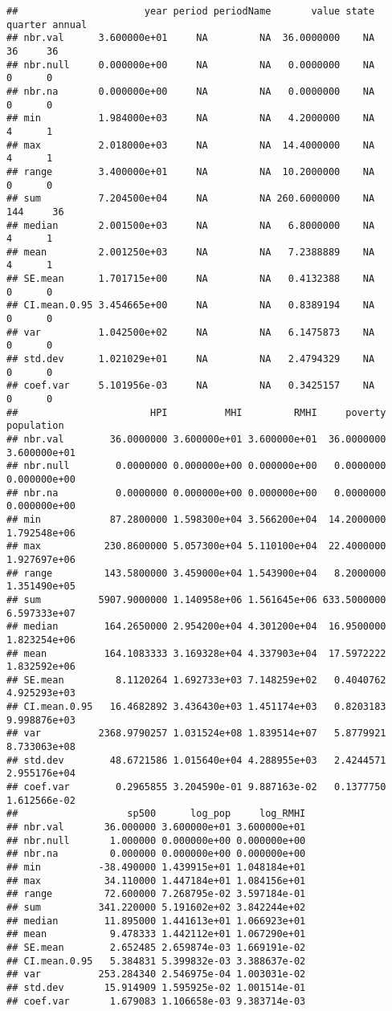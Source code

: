 \documentclass[
]{article}
\begin{document}
\begin{verbatim}
##                      year period periodName       value state quarter annual
## nbr.val      3.600000e+01     NA         NA  36.0000000    NA      36     36
## nbr.null     0.000000e+00     NA         NA   0.0000000    NA       0      0
## nbr.na       0.000000e+00     NA         NA   0.0000000    NA       0      0
## min          1.984000e+03     NA         NA   4.2000000    NA       4      1
## max          2.018000e+03     NA         NA  14.4000000    NA       4      1
## range        3.400000e+01     NA         NA  10.2000000    NA       0      0
## sum          7.204500e+04     NA         NA 260.6000000    NA     144     36
## median       2.001500e+03     NA         NA   6.8000000    NA       4      1
## mean         2.001250e+03     NA         NA   7.2388889    NA       4      1
## SE.mean      1.701715e+00     NA         NA   0.4132388    NA       0      0
## CI.mean.0.95 3.454665e+00     NA         NA   0.8389194    NA       0      0
## var          1.042500e+02     NA         NA   6.1475873    NA       0      0
## std.dev      1.021029e+01     NA         NA   2.4794329    NA       0      0
## coef.var     5.101956e-03     NA         NA   0.3425157    NA       0      0
##                       HPI          MHI         RMHI     poverty   population
## nbr.val        36.0000000 3.600000e+01 3.600000e+01  36.0000000 3.600000e+01
## nbr.null        0.0000000 0.000000e+00 0.000000e+00   0.0000000 0.000000e+00
## nbr.na          0.0000000 0.000000e+00 0.000000e+00   0.0000000 0.000000e+00
## min            87.2800000 1.598300e+04 3.566200e+04  14.2000000 1.792548e+06
## max           230.8600000 5.057300e+04 5.110100e+04  22.4000000 1.927697e+06
## range         143.5800000 3.459000e+04 1.543900e+04   8.2000000 1.351490e+05
## sum          5907.9000000 1.140958e+06 1.561645e+06 633.5000000 6.597333e+07
## median        164.2650000 2.954200e+04 4.301200e+04  16.9500000 1.823254e+06
## mean          164.1083333 3.169328e+04 4.337903e+04  17.5972222 1.832592e+06
## SE.mean         8.1120264 1.692733e+03 7.148259e+02   0.4040762 4.925293e+03
## CI.mean.0.95   16.4682892 3.436430e+03 1.451174e+03   0.8203183 9.998876e+03
## var          2368.9790257 1.031524e+08 1.839514e+07   5.8779921 8.733063e+08
## std.dev        48.6721586 1.015640e+04 4.288955e+03   2.4244571 2.955176e+04
## coef.var        0.2965855 3.204590e-01 9.887163e-02   0.1377750 1.612566e-02
##                   sp500      log_pop     log_RMHI
## nbr.val       36.000000 3.600000e+01 3.600000e+01
## nbr.null       1.000000 0.000000e+00 0.000000e+00
## nbr.na         0.000000 0.000000e+00 0.000000e+00
## min          -38.490000 1.439915e+01 1.048184e+01
## max           34.110000 1.447184e+01 1.084156e+01
## range         72.600000 7.268795e-02 3.597184e-01
## sum          341.220000 5.191602e+02 3.842244e+02
## median        11.895000 1.441613e+01 1.066923e+01
## mean           9.478333 1.442112e+01 1.067290e+01
## SE.mean        2.652485 2.659874e-03 1.669191e-02
## CI.mean.0.95   5.384831 5.399832e-03 3.388637e-02
## var          253.284340 2.546975e-04 1.003031e-02
## std.dev       15.914909 1.595925e-02 1.001514e-01
## coef.var       1.679083 1.106658e-03 9.383714e-03
\end{verbatim}
\end{document}
